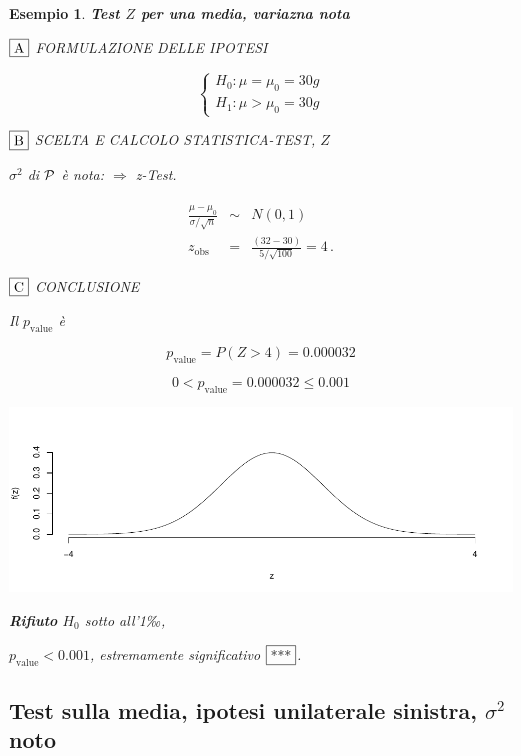 \documentclass[
  11pt,
]{book}
\theoremstyle{mytheoremstyle}
\theoremstyle{mydefstyle}
\newtheorem{example}{{Esempio}}[section]
\begin{document}
\begin{example}
\textbf{Test \(Z\) per una media, variazna nota}

\(\fbox{A}\) FORMULAZIONE DELLE IPOTESI

\[\begin{cases}
   H_0: \mu = \mu_0=30g \\
   H_1: \mu > \mu_0=30g 
   \end{cases}\]

\(\fbox{B}\) SCELTA E CALCOLO STATISTICA-TEST, \(Z\)

\(\sigma^{2}\) di \(\cal{P}\) è nota: \(\Rightarrow\) z-Test.

\begin{eqnarray*}
   \frac{\hat\mu - \mu_{0}} {\sigma/\sqrt{n}}&\sim&N(0,1)\\
   z_{\text{obs}}
   &=& \frac{ ( 32 -  30 )} { 5 /\sqrt{ 100 }}
   =   4 \, .
   \end{eqnarray*}

\(\fbox{C}\) CONCLUSIONE

Il \(p_{\text{value}}\) è

\[ p_{\text{value}} = P(Z>4)=0.000032 \]

\[
 0 < p_\text{value}= 0.000032 \leq 0.001 
\]

\begin{center}\includegraphics{Appunti_di_Statistica_2025_files/figure-latex/unnamed-chunk-13-1} \end{center}

\textbf{Rifiuto} \(H_0\) sotto all'1‰,

\(p_\text{value}<0.001\), \emph{estremamente significativo} \(\fbox{***}\).
\end{example}

\subsection{\texorpdfstring{Test sulla media, ipotesi unilaterale sinistra, \(\sigma^2\) noto}{Test sulla media, ipotesi unilaterale sinistra, \textbackslash sigma\^{}2 noto}}\label{test-sulla-media-ipotesi-unilaterale-sinistra-sigma2-noto}
\end{document}
